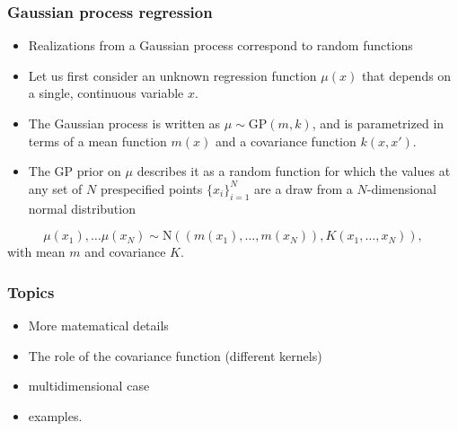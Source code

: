 \documentclass{beamer}
\begin{document}
\begin{frame}
\frametitle{Gaussian process regression}

\begin{itemize}
\item Realizations from a Gaussian process correspond to random functions

\item Let us first consider an unknown regression function $\mu(x)$ that
  depends on a single, continuous variable $x$.

\item The Gaussian process is written as $\mu \sim \mathrm{GP}(m,k)$, and
  is parametrized in terms of a mean function $m(x)$ and a covariance
  function $k(x,x')$.

\item The GP prior on $\mu$ describes it as a random function for which
  the values at any set of $N$ prespecified points $\{x_i\}_{i=1}^N$
  are a draw from a $N$-dimensional normal distribution
\end{itemize}

\noindent
$$
  \mu(x_1), \ldots \mu(x_N) \sim \mathrm{N}\left( \left( m(x_1),
  \ldots, m(x_N) \right), K(x_1, \ldots, x_N) \right),
$$
  with mean $m$ and covariance $K$.
\end{frame}

\begin{frame}
\frametitle{Topics}

\begin{itemize}
\item More matematical details

\item The role of the covariance function (different kernels)

\item multidimensional case

\item examples.
\end{itemize}

\noindent
\end{frame}
\end{document}
